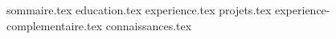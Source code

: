 \documentclass[11pt, a4paper]{awesome-cv}
\newcommand*{\sectiondir}{resume/}
\begin{document}
\makecvheader

{sommaire.tex}
{education.tex}
{experience.tex}
{projets.tex}
{experience-complementaire.tex}
{connaissances.tex}
\end{document}
